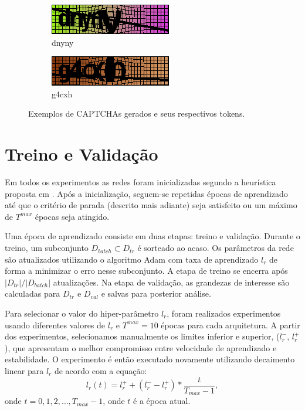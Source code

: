 \begin{figure}[ht]
	\begin{subfigure}{.5\textwidth}
		\centering
		\includegraphics[width=.9\linewidth]{figuras/12248_dnyny.png}
		\caption{dnyny}
	\end{subfigure}
	\begin{subfigure}{.5\textwidth}
		\centering
		\includegraphics[width=.9\linewidth]{figuras/8873_g4cxh.png}
		\caption{g4cxh}
	\end{subfigure}%
	\vspace{.05\linewidth}
	\caption{Exemplos de CAPTCHAs gerados e seus respectivos tokens.}
	\label{imgcaptchas}
\end{figure}


\section{Treino e Validação}

Em todos os experimentos as redes foram inicializadas segundo a heurística proposta em \cite{HeZR015relu}. Após a inicialização, seguem-se repetidas épocas de aprendizado até que o critério de parada (descrito mais adiante) seja satisfeito ou um máximo de $T^{max}$ épocas seja atingido.

Uma época de aprendizado consiste em duas etapas: treino e validação. Durante o treino, um subconjunto $D_{batch} \subset D_{tr}$ é sorteado ao acaso. Os parâmetros da rede são atualizados utilizando o algoritmo Adam\cite{adam_op} com taxa de aprendizado $l_r$ de forma a minimizar o erro nesse subconjunto. A etapa de treino se encerra após $|D_{tr}|/|D_{batch}|$ atualizações. Na etapa de validação, as grandezas de interesse são calculadas para $D_{tr}$ e $D_{val}$ e salvas para posterior análise.

Para selecionar o valor do hiper-parâmetro $l_r$, foram realizados experimentos usando diferentes valores de $l_r$ e $T^{max}=10$ épocas para cada arquitetura. A partir dos experimentos, selecionamos manualmente os limites inferior e superior, ($l_r^-$, $l_r^+$), que apresentam o melhor compromisso entre velocidade de aprendizado e estabilidade. O experimento é então executado novamente utilizando decaimento linear para $l_r$ de acordo com a equação:
\begin{equation}
l_r(t) = l_r^+ + (l_r^- - l_r^+) * \frac{t}{T_{max}-1},
\end{equation}
onde $t = 0, 1, 2, \ldots, T_{max}-1$, onde $t$ é a época atual.

